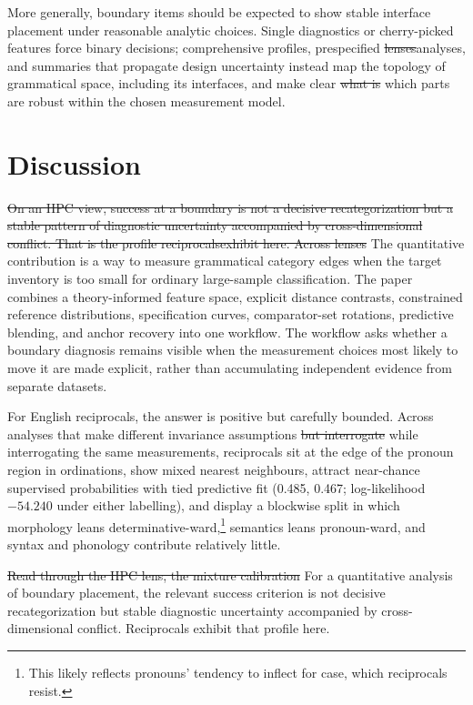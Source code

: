 \documentclass[12pt]{article}
\providecommand{\DIFaddtex}[1]{{\protect\color{DIFgreen}#1}} %
\providecommand{\DIFdeltex}[1]{{\protect\color{red}\sout{#1}}}                      %
\providecommand{\DIFaddbegin}{} %
\providecommand{\DIFaddend}{} %
\providecommand{\DIFdelbegin}{} %
\providecommand{\DIFdelend}{} %
\providecommand{\DIFadd}[1]{\texorpdfstring{\DIFaddtex{#1}}{#1}} %
\providecommand{\DIFdel}[1]{\texorpdfstring{\DIFdeltex{#1}}{}} %
\newcommand{\DIFscaledelfig}{0.5}
\newlength{\DIFdelgraphicswidth} %
\newlength{\DIFdelgraphicsheight} %
\newcommand{\DIFaddincludegraphics}[2][]{{\color{DIFgreen}\fbox{\DIFOincludegraphics[#1]{#2}}}} %
\newcommand{\DIFdelincludegraphics}[2][]{%
\sbox{\DIFdelgraphicsbox}{\DIFOincludegraphics[#1]{#2}}%
\settoboxwidth{\DIFdelgraphicswidth}{\DIFdelgraphicsbox} %
\settoboxtotalheight{\DIFdelgraphicsheight}{\DIFdelgraphicsbox} %
\scalebox{\DIFscaledelfig}{%
\parbox[b]{\DIFdelgraphicswidth}{\usebox{\DIFdelgraphicsbox}\\[-\baselineskip] \rule{\DIFdelgraphicswidth}{0em}}\llap{\resizebox{\DIFdelgraphicswidth}{\DIFdelgraphicsheight}{%
\setlength{\unitlength}{\DIFdelgraphicswidth}%
\begin{picture}(1,1)%
\thicklines\linethickness{2pt} %
{\color[rgb]{1,0,0}\put(0,0){\framebox(1,1){}}}%
{\color[rgb]{1,0,0}\put(0,0){\line( 1,1){1}}}%
{\color[rgb]{1,0,0}\put(0,1){\line(1,-1){1}}}%
\end{picture}%
}\hspace*{3pt}}} %
} %
\DeclareRobustCommand{\DIFaddbegin}{\DIFOaddbegin \let\includegraphics\DIFaddincludegraphics} %
\DeclareRobustCommand{\DIFaddend}{\DIFOaddend \let\includegraphics\DIFOincludegraphics} %
\DeclareRobustCommand{\DIFdelbegin}{\DIFOdelbegin \let\includegraphics\DIFdelincludegraphics} %
\DeclareRobustCommand{\DIFdelend}{\DIFOaddend \let\includegraphics\DIFOincludegraphics} %
\begin{document}
More generally, boundary items should be expected to show stable interface placement under reasonable analytic choices. Single diagnostics or cherry-picked features force binary decisions; comprehensive profiles, prespecified \DIFdelbegin \DIFdel{lenses}\DIFdelend \DIFaddbegin \DIFadd{analyses}\DIFaddend , and summaries that propagate design uncertainty instead map the topology of grammatical space, including its interfaces, and make clear \DIFdelbegin \DIFdel{what is }\DIFdelend \DIFaddbegin \DIFadd{which parts are }\DIFaddend robust within the chosen measurement model.


\section{Discussion}

\DIFdelbegin \DIFdel{On an HPC view, success at a boundary is not a decisive recategorization but a stable pattern of diagnostic uncertainty accompanied by cross-dimensional conflict. That is the profile reciprocalsexhibit here. Across lenses }\DIFdelend \DIFaddbegin \DIFadd{The quantitative contribution is a way to measure grammatical category edges when the target inventory is too small for ordinary large-sample classification. The paper combines a theory-informed feature space, explicit distance contrasts, constrained reference distributions, specification curves, comparator-set rotations, predictive blending, and anchor recovery into one workflow. The workflow asks whether a boundary diagnosis remains visible when the measurement choices most likely to move it are made explicit, rather than accumulating independent evidence from separate datasets.
}

\DIFadd{For English reciprocals, the answer is positive but carefully bounded. Across analyses }\DIFaddend that make different invariance assumptions \DIFdelbegin \DIFdel{but interrogate }\DIFdelend \DIFaddbegin \DIFadd{while interrogating }\DIFaddend the same measurements, reciprocals sit at the edge of the pronoun region in ordinations, show mixed nearest neighbours, attract near-chance supervised probabilities with tied predictive fit (0.485, 0.467; log-likelihood $-54.240$ under either labelling), and display a blockwise split in which morphology leans determinative-ward,\footnote{This likely reflects pronouns' tendency to inflect for case, which reciprocals resist.} semantics leans pronoun-ward, and syntax and phonology contribute relatively little.

\DIFdelbegin \DIFdel{Read through the HPC lens, the mixture calibration }\DIFdelend \DIFaddbegin \DIFadd{For a quantitative analysis of boundary placement, the relevant success criterion is not decisive recategorization but stable diagnostic uncertainty accompanied by cross-dimensional conflict. Reciprocals exhibit that profile here.
}
\end{document}
